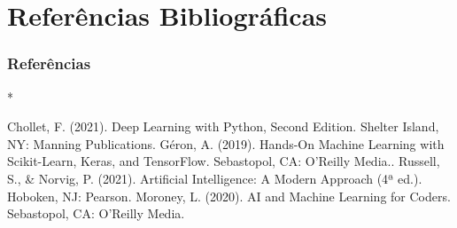 \documentclass{beamer}
\begin{document}
\section{Referências Bibliográficas}
\begin{frame}[t,allowframebreaks]
\frametitle{Referências}
%
%
\begin{thebibliography}{*}

          Chollet, F. (2021). Deep Learning with Python, Second Edition. Shelter Island, NY: Manning Publications.
         Géron, A. (2019). Hands-On Machine Learning with Scikit-Learn, Keras, and TensorFlow. Sebastopol, CA: O'Reilly Media..
         Russell, S., \& Norvig, P. (2021). Artificial Intelligence: A Modern Approach (4ª ed.). Hoboken, NJ: Pearson.
        Moroney, L. (2020). AI and Machine Learning for Coders. Sebastopol, CA: O'Reilly Media.




\end{thebibliography}
\end{frame}
\section{}


\begin{frame}
\titlepage
\end{frame}
\end{document}
